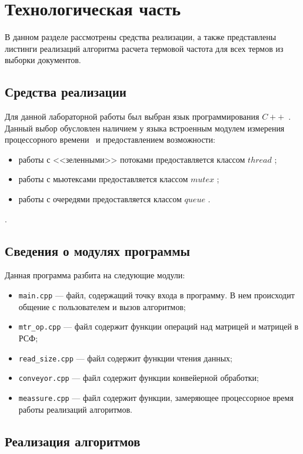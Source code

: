 \chapter{Технологическая часть}

В данном разделе рассмотрены средства реализации, а также представлены листинги реализаций алгоритма расчета термовой частота для всех термов из выборки документов.

\section{Средства реализации}

Для данной лабораторной работы был выбран язык программирования $C++$~\cite{cpp-lang}. 
Данный выбор обусловлен наличием у языка встроенным модулем измерения процессорного времени~\cite{cpp-time} и предоставлением возможности:
\begin{itemize}
	\item работы с <<зеленными>> потоками предоставляется классом $thread$ \cite{thread};
	\item работы с мьютексами предоставляется классом $mutex$ \cite{mutex};
	\item работы с очередями предоставляется классом $queue$ \cite{queue}.
\end{itemize}.

\section{Сведения о модулях программы}

Данная программа разбита на следующие модули:

\begin{itemize}[label=---]
	\item \texttt{main.cpp} --- файл, содержащий точку входа в программу. В нем происходит общение с пользователем и вызов алгоритмов;
	\item \texttt{mtr\_op.cpp} --- файл содержит функции операций над матрицей и матрицей в РСФ;
	\item \texttt{read\_size.cpp} --- файл содержит функции чтения данных;
	\item \texttt{conveyor.cpp} --- файл содержит функции конвейерной обработки;
	\item \texttt{meassure.cpp} --- файл содержит функции, замеряющее процессорное время работы реализаций алгоритмов.
\end{itemize}

\section{Реализация алгоритмов}

